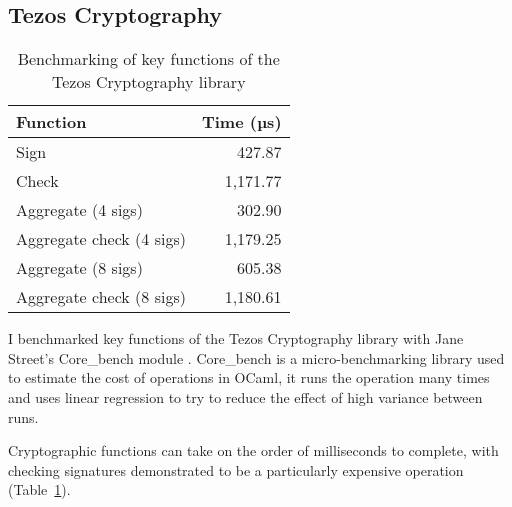 \subsection{Tezos Cryptography} \label{tezosbenchmark}

\begin{table}[h]
	\centering
	\begin{tabular}{|l|r|}
	\hline
	Function                 & Time (µs) \\ \hline
	Sign                     & 427.87   \\
	Check                    & 1,171.77 \\
	Aggregate (4 sigs)       & 302.90   \\
	Aggregate check (4 sigs) & 1,179.25 \\
	Aggregate (8 sigs)       & 605.38   \\
	Aggregate check (8 sigs) & 1,180.61 \\ \hline
	\end{tabular}
	\caption{Benchmarking of key functions of the Tezos Cryptography library}
	\label{tezostable}
\end{table}

I benchmarked key functions of the Tezos Cryptography library \cite{tezosCrypto} with Jane Street's Core\_bench module \cite{janestreetCoreBench2023}. Core\_bench is a micro-benchmarking library used to estimate the cost of operations in OCaml, it runs the operation many times and uses linear regression to try to reduce the effect of high variance between runs.

Cryptographic functions can take on the order of milliseconds to complete, with checking signatures demonstrated to be a particularly expensive operation (Table~\ref{tezostable}).


